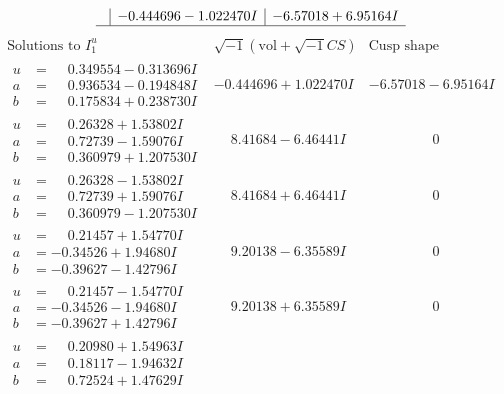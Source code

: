 \documentclass[1p]{elsarticle_modified}
\theoremstyle{definition}
\newcommand{\I}{\sqrt{-1}}
\begin{document}
$$\begin{array}{c|c|c}
 & -0.444696 - 1.022470 I & -6.57018 + 6.95164 I\\
 \hline 
 \end{array}$$\newpage$$\begin{array}{c|c|c}  
\text{Solutions to }I^u_{1}& \I (\text{vol} + \sqrt{-1}CS) & \text{Cusp shape}\\
 \hline 
\begin{aligned}
u &= \phantom{-}0.349554 - 0.313696 I \\
a &= \phantom{-}0.936534 - 0.194848 I \\
b &= \phantom{-}0.175834 + 0.238730 I\end{aligned}
 & -0.444696 + 1.022470 I & -6.57018 - 6.95164 I \\ \hline\begin{aligned}
u &= \phantom{-}0.26328 + 1.53802 I \\
a &= \phantom{-}0.72739 - 1.59076 I \\
b &= \phantom{-}0.360979 + 1.207530 I\end{aligned}
 & \phantom{-}8.41684 - 6.46441 I & \phantom{-0.000000 } 0 \\ \hline\begin{aligned}
u &= \phantom{-}0.26328 - 1.53802 I \\
a &= \phantom{-}0.72739 + 1.59076 I \\
b &= \phantom{-}0.360979 - 1.207530 I\end{aligned}
 & \phantom{-}8.41684 + 6.46441 I & \phantom{-0.000000 } 0 \\ \hline\begin{aligned}
u &= \phantom{-}0.21457 + 1.54770 I \\
a &= -0.34526 + 1.94680 I \\
b &= -0.39627 - 1.42796 I\end{aligned}
 & \phantom{-}9.20138 - 6.35589 I & \phantom{-0.000000 } 0 \\ \hline\begin{aligned}
u &= \phantom{-}0.21457 - 1.54770 I \\
a &= -0.34526 - 1.94680 I \\
b &= -0.39627 + 1.42796 I\end{aligned}
 & \phantom{-}9.20138 + 6.35589 I & \phantom{-0.000000 } 0 \\ \hline\begin{aligned}
u &= \phantom{-}0.20980 + 1.54963 I \\
a &= \phantom{-}0.18117 - 1.94632 I \\
b &= \phantom{-}0.72524 + 1.47629 I\end{aligned}

\end{array}$$
\end{document}
